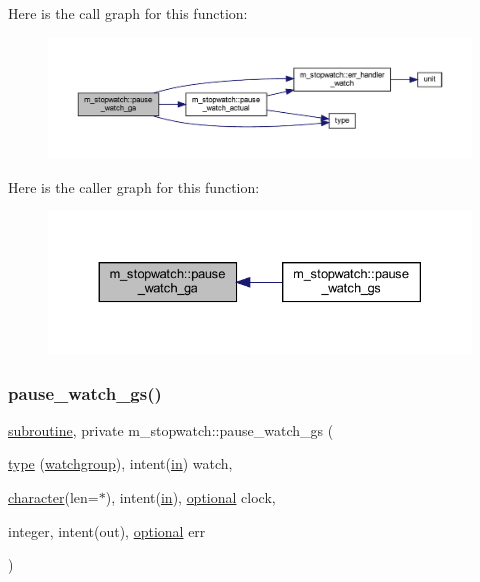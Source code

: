 Here is the call graph for this function\+:
\nopagebreak
\begin{figure}[H]
\begin{center}
\leavevmode
\includegraphics[width=350pt]{namespacem__stopwatch_aaba5f0339d92da284d233dcb2f4d083a_cgraph}
\end{center}
\end{figure}
Here is the caller graph for this function\+:
\nopagebreak
\begin{figure}[H]
\begin{center}
\leavevmode
\includegraphics[width=330pt]{namespacem__stopwatch_aaba5f0339d92da284d233dcb2f4d083a_icgraph}
\end{center}
\end{figure}
\mbox{\label{namespacem__stopwatch_a25c025ae33c702473780e6d53dd5e054}} 
\subsubsection{\texorpdfstring{pause\+\_\+watch\+\_\+gs()}{pause\_watch\_gs()}}
{\footnotesize\ttfamily \hyperlink{M__stopwatch_83_8txt_acfbcff50169d691ff02d4a123ed70482}{subroutine}, private m\+\_\+stopwatch\+::pause\+\_\+watch\+\_\+gs (\begin{DoxyParamCaption}\item[{\hyperlink{stop__watch_83_8txt_a70f0ead91c32e25323c03265aa302c1c}{type} (\hyperlink{structm__stopwatch_1_1watchgroup}{watchgroup}), intent(\hyperlink{M__journal_83_8txt_afce72651d1eed785a2132bee863b2f38}{in})}]{watch,  }\item[{\hyperlink{option__stopwatch_83_8txt_abd4b21fbbd175834027b5224bfe97e66}{character}(len=$\ast$), intent(\hyperlink{M__journal_83_8txt_afce72651d1eed785a2132bee863b2f38}{in}), \hyperlink{option__stopwatch_83_8txt_aa4ece75e7acf58a4843f70fe18c3ade5}{optional}}]{clock,  }\item[{integer, intent(out), \hyperlink{option__stopwatch_83_8txt_aa4ece75e7acf58a4843f70fe18c3ade5}{optional}}]{err }\end{DoxyParamCaption})\hspace{0.3cm}{\ttfamily [private]}}




